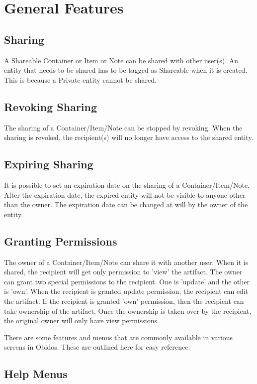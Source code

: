 \chapter{General Features}

\section{Sharing}
A Shareable Container or Item or Note can be shared with other user(s). An entity that needs to be shared has to be tagged as Shareable when it is created. This is because a Private entity cannot be shared.

\section{Revoking Sharing}
The sharing of a Container/Item/Note can be stopped by revoking. When the sharing is revoked, the recipient(s) will no longer have access to the shared entity.

\section{Expiring Sharing}
It is possible to set an expiration date on the sharing of a Container/Item/Note. After the expiration date, the expired entity will not be visible to anyone other than the owner. The expiration date can be changed at will by the owner of the entity.

\section{Granting Permissions}
The owner of a Container/Item/Note can share it with another user. When it is shared, the recipient will get
only permission to 'view' the artifact. The owner can grant two special permissions to the recipient. One is 'update' and the other is 'own'. When the recipient is granted update permission, the recipient can edit the artifact. If the recipient is granted 'own' permission, then the recipient can take ownership of the artifact. Once the ownership is taken over by the recipient, the original owner will only have view permissions.

There are some features and menus that are commonly available in various screens in Obidos. 
These are outlined here for easy reference.

\section{Help Menus}
